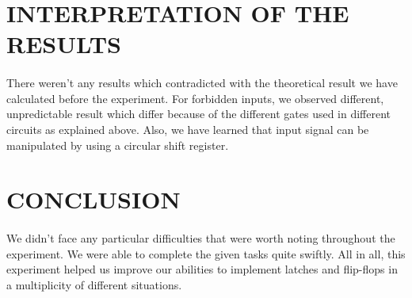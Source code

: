 \documentclass[pdftex,12pt,a4paper]{article}
\begin{document}
\newpage
\section{INTERPRETATION OF THE RESULTS}
\begin{flushleft}
\paragraph{}
There weren't any results which contradicted with the theoretical result we have calculated before the experiment. For forbidden inputs, we observed different, unpredictable result which differ because of the different gates used in different circuits as explained above. Also, we have learned that input signal can be manipulated by using a circular shift register.
\end{flushleft}

\section{CONCLUSION}
\begin{flushleft}
\paragraph{}
We didn't face any particular difficulties that were worth noting throughout the experiment. We were able to complete the given tasks quite swiftly. All in all, this experiment helped us improve our abilities to implement latches and flip-flops in a multiplicity of different situations.

\end{flushleft}

\nocite{overleaf}
\nocite{reportGuide}

\newpage





\end{document}
